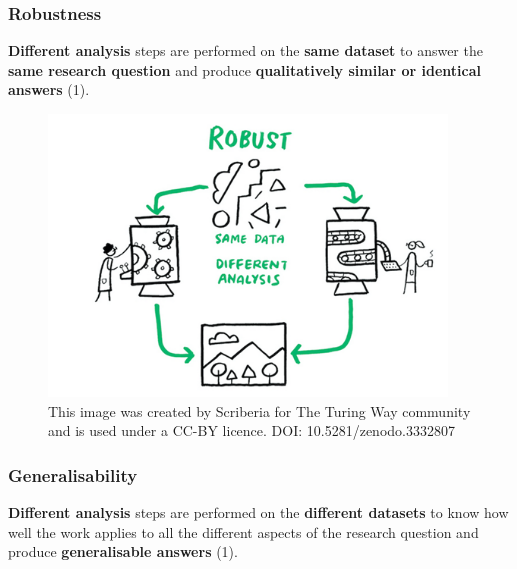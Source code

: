 \documentclass[
  letterpaper,
  DIV=11,
  numbers=noendperiod,
  oneside]{scrreprt}
\begin{document}
\hypertarget{robustness}{%
\subsubsection{Robustness}\label{robustness}}

\textbf{Different analysis} steps are performed on the \textbf{same
dataset} to answer the \textbf{same research question} and produce
\textbf{qualitatively similar or identical answers} (1).

\begin{figure}

{\centering \includegraphics[width=4.16667in,height=\textheight]{./images/paste-1E28AEDC.png}

}

\caption{\label{fig-robustness}This image was created by Scriberia for
The Turing Way community and is used under a CC-BY licence. DOI:
10.5281/zenodo.3332807}

\end{figure}

\hypertarget{generalisability}{%
\subsubsection{Generalisability}\label{generalisability}}

\textbf{Different analysis} steps are performed on the \textbf{different
datasets} to know how well the work applies to all the different aspects
of the research question and produce \textbf{generalisable answers} (1).
\end{document}
